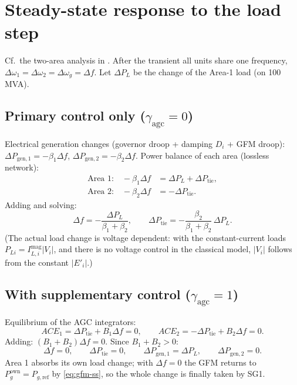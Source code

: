 \documentclass[11pt,a4paper]{article}
\numberwithin{equation}{section}
\begin{document}
\section{Steady-state response to the load step}\label{sec:ss}
%
\noindent Cf.\ the two-area analysis in \cite[Ch.~11]{Kundur1994}.
After the transient all units share one frequency, $\Delta\omega_1=\Delta\omega_2=\Delta\omega_g=\Delta f$. Let $\Delta P_L$ be the change of the Area-1 load (on 100 MVA).

\subsection{Primary control only ($\gamma_{\text{agc}}=0$)}
Electrical generation changes (governor droop + damping $D_i$ + GFM droop): $\Delta P_{\text{gen},1} = -\beta_1\Delta f$, $\Delta P_{\text{gen},2} = -\beta_2\Delta f$.
Power balance of each area (lossless network):
\begin{align}
\text{Area 1:}\quad -\beta_1\Delta f &= \Delta P_L + \Delta P_{\text{tie}},\\
\text{Area 2:}\quad -\beta_2\Delta f &= -\Delta P_{\text{tie}} .
\end{align}
Adding and solving:
\begin{equation}
\boxed{\Delta f = -\frac{\Delta P_L}{\beta_1+\beta_2},\qquad
\Delta P_{\text{tie}} = -\frac{\beta_2}{\beta_1+\beta_2}\,\Delta P_L .}
\end{equation}
(The actual load change is voltage dependent: with the constant-current loads $P_{Li} = I_{L,i}^{\text{mag}}|V_i|$, and there is no voltage control in the classical model, $|V_i|$ follows from the constant $|E'_i|$.)

\subsection{With supplementary control ($\gamma_{\text{agc}}=1$)}
Equilibrium of the AGC integrators:
\begin{equation}
ACE_1 = \Delta P_{\text{tie}} + B_1\Delta f = 0,\qquad ACE_2 = -\Delta P_{\text{tie}} + B_2\Delta f = 0 .
\end{equation}
Adding: $(B_1+B_2)\Delta f = 0$. Since $B_1+B_2>0$:
\begin{equation}
\boxed{\Delta f = 0,\qquad \Delta P_{\text{tie}} = 0,\qquad \Delta P_{\text{gen},1} = \Delta P_L,\qquad \Delta P_{\text{gen},2} = 0 .}
\end{equation}
Area 1 absorbs its own load change; with $\Delta f=0$ the GFM returns to $P_g^{\text{own}} = P_{g,\text{ref}}$ by \eqref{eq:gfm-ss}, so the whole change is finally taken by SG1.
\end{document}
